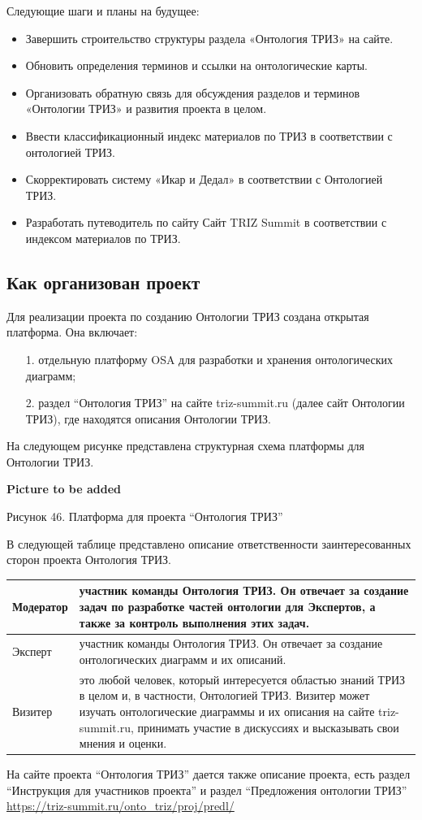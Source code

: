 \documentclass[11pt,a4paper]{article}
\newcommand{\addpicture}{\textbf{Picture to be added}\par}
\begin{document}
Следующие шаги и планы на будущее: 
\begin{itemize}
\item Завершить строительство структуры раздела «Онтология ТРИЗ» на сайте.
\item Обновить определения терминов и ссылки на онтологические карты.
\item Организовать обратную связь для обсуждения разделов и терминов
  «Онтологии ТРИЗ» и развития проекта в целом.
\item Ввести классификационный индекс материалов по ТРИЗ в соответствии с
  онтологией ТРИЗ.
\item Скорректировать систему «Икар и Дедал» в соответствии с Онтологией
  ТРИЗ. 
\item Разработать путеводитель по сайту Сайт TRIZ Summit в соответствии с
  индексом материалов по ТРИЗ.
\end{itemize}

\subsection{Как организован проект}

Для реализации проекта по созданию Онтологии ТРИЗ создана открытая платформа.
Она включает:
\begin{itemize}
\item[1.] отдельную платформу OSA для разработки и хранения онтологических
  диаграмм;
\item[2.] раздел “Онтология ТРИЗ” на сайте triz-summit.ru (далее сайт
  Онтологии ТРИЗ), где находятся описания Онтологии ТРИЗ.
\end{itemize}
На следующем рисунке представлена структурная схема платформы для Онтологии
ТРИЗ.
\begin{center}
  \addpicture
  Рисунок 46. Платформа для проекта “Онтология ТРИЗ”
\end{center}
В следующей таблице представлено описание
ответственности заинтересованных сторон проекта Онтология ТРИЗ.
\begin{center}
  \begin{tabular}{|l|p{12cm}|}\hline
    Модератор & участник команды Онтология ТРИЗ. Он отвечает за создание задач
    по разработке частей онтологии для Экспертов, а также за контроль
    выполнения этих задач.\\\hline
    Эксперт & участник команды Онтология ТРИЗ. Он отвечает за создание
    онтологических диаграмм и их описаний.\\\hline
    Визитер & это любой человек, который интересуется областью знаний ТРИЗ в
    целом и, в частности, Онтологией ТРИЗ. Визитер может изучать
    онтологические диаграммы и их описания на сайте triz-summit.ru, принимать
    участие в дискуссиях и высказывать свои мнения и оценки. \\\hline
  \end{tabular}
\end{center}
На сайте проекта “Онтология ТРИЗ” дается также описание проекта, есть раздел
“Инструкция для участников проекта” и раздел “Предложения онтологии ТРИЗ”
\url{https://triz-summit.ru/onto_triz/proj/predl/}
\end{document}

